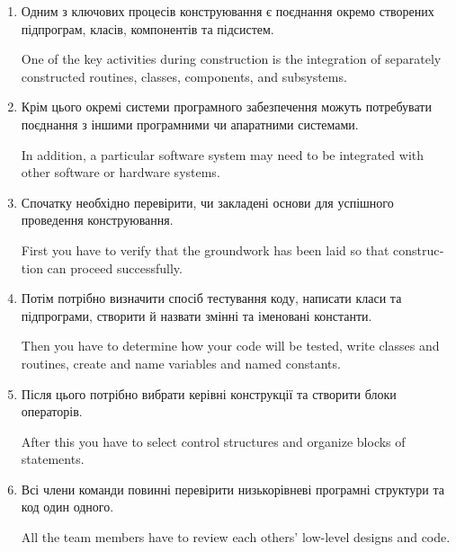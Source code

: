 \documentclass[a4paper,oneside,12pt,DIV=9]{scrartcl}
\begin{document}
\begin{enumerate}
		\item Одним з ключових процесів конструювання є поєднання окремо створених підпрограм, класів, компонентів та підсистем.
		
		\begin{english}
			One of the key activities during construction is the integration of separately constructed routines, classes, components, and subsystems.
		\end{english}
		
		\item Крім цього окремі системи програмного забезпечення можуть потребувати поєднання з іншими програмними чи апаратними системами.
		
		\begin{english}
			In addition, a particular software system may need to be integrated with other software or hardware systems.
		\end{english}
		
		\item Спочатку необхідно перевірити, чи закладені основи для успішного проведення конструювання.
		
		\begin{english}
			First you have to verify that the groundwork has been laid so that construction can proceed successfully.
		\end{english}
		
		\item Потім потрібно визначити спосіб тестування коду, написати класи та підпрограми, створити й назвати змінні та іменовані константи.
		
		\begin{english}
			Then you have to determine how your code will be tested, write classes and routines, create and name variables and named constants.
		\end{english}
		
		\item Після цього потрібно вибрати керівні конструкції та створити блоки операторів.
		
		\begin{english}
			After this you have to select control structures and organize blocks of statements.
		\end{english}
		
		\item Всі члени команди повинні перевірити низькорівневі програмні структури та код один одного.
		
		\begin{english}
			All the team members have to review each others' low-level designs and code.
		\end{english}
		

\end{enumerate}
\end{document}
